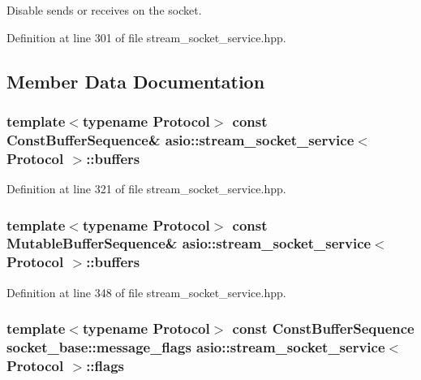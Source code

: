 Disable sends or receives on the socket. 



Definition at line 301 of file stream\+\_\+socket\+\_\+service.\+hpp.



\subsection{Member Data Documentation}
\hypertarget{classasio_1_1stream__socket__service_a2b418591be64237dabe9260a184d2a2a}{}
\subsubsection[{buffers}]{\setlength{\rightskip}{0pt plus 5cm}template$<$typename Protocol$>$ const Const\+Buffer\+Sequence\& {\bf asio\+::stream\+\_\+socket\+\_\+service}$<$ Protocol $>$\+::buffers}\label{classasio_1_1stream__socket__service_a2b418591be64237dabe9260a184d2a2a}


Definition at line 321 of file stream\+\_\+socket\+\_\+service.\+hpp.

\hypertarget{classasio_1_1stream__socket__service_ac2c573da311f37dca37d770fad21003b}{}
\subsubsection[{buffers}]{\setlength{\rightskip}{0pt plus 5cm}template$<$typename Protocol$>$ const Mutable\+Buffer\+Sequence\& {\bf asio\+::stream\+\_\+socket\+\_\+service}$<$ Protocol $>$\+::buffers}\label{classasio_1_1stream__socket__service_ac2c573da311f37dca37d770fad21003b}


Definition at line 348 of file stream\+\_\+socket\+\_\+service.\+hpp.

\hypertarget{classasio_1_1stream__socket__service_ab3077e35cb3e3ff867fb8c45233f7d69}{}
\subsubsection[{flags}]{\setlength{\rightskip}{0pt plus 5cm}template$<$typename Protocol$>$ const Const\+Buffer\+Sequence {\bf socket\+\_\+base\+::message\+\_\+flags} {\bf asio\+::stream\+\_\+socket\+\_\+service}$<$ Protocol $>$\+::flags}\label{classasio_1_1stream__socket__service_ab3077e35cb3e3ff867fb8c45233f7d69}


